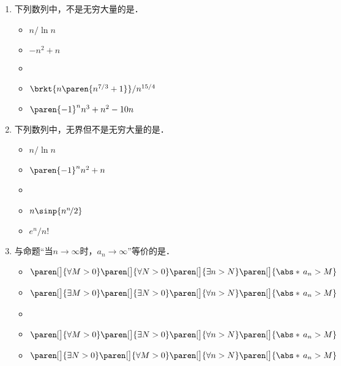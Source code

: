 \begin{enumerate}
\item 下列数列中，不是无穷大量的是\uline{\makebox[8em]{}}．
  \begin{itemize}
    \renewcommand{\labelitemi}{\faCircleThin}
  \item \(n/\!\ln n\)
  \item \(-n^2 + n\)
    \ifshowsol
    \item[\faCircle]
    \else
    \item
    \fi
    \(\brkt{n\paren{n^{7/3}+1}}/n^{15/4}\)
  \item \(\paren{-1}^n n^3 + n^2 - 10n\)
  \end{itemize}

\item 下列数列中，无界但不是无穷大量的是\uline{\makebox[6em]{}}．
  \begin{itemize}
    \renewcommand{\labelitemi}{\faCircleThin}
  \item \(n/\!\ln n\)
  \item \(\paren{-1}^n n^2 + n\)
    \ifshowsol
    \item[\faCircle]
    \else
    \item
    \fi
    \(n \sinp{n^n\!/2}\)
  \item \(e^n\!/n!\)
  \end{itemize}

\item 与命题“当\(n\to\infty\)时，\(a_n\to\infty\)”等价的是\uline{\makebox[10em]{}}．
  \begin{itemize}
    \renewcommand{\labelitemi}{\faCircleThin}
  \item \(
    \paren[\big]{\forall M > 0}
    \paren[\big]{\forall N > 0}
    \paren[\big]{\exists n > N}
    \paren[\big]{\abs*{\,a_n} > M}
    \)
  \item \(
    \paren[\big]{\exists M > 0}
    \paren[\big]{\exists N > 0}
    \paren[\big]{\forall n > N}
    \paren[\big]{\abs*{\,a_n} > M}
    \)
    \ifshowsol
    \item[\faCircle]
    \else
    \item
    \fi
    \(
    \paren[\big]{\forall M > 0}
    \paren[\big]{\exists N > 0}
    \paren[\big]{\forall n > N}
    \paren[\big]{\abs*{\,a_n} > M}
    \)
  \item \(
    \paren[\big]{\exists N > 0}
    \paren[\big]{\forall M > 0}
    \paren[\big]{\forall n > N}
    \paren[\big]{\abs*{\,a_n} > M}
    \)
  \end{itemize}


\end{enumerate}
